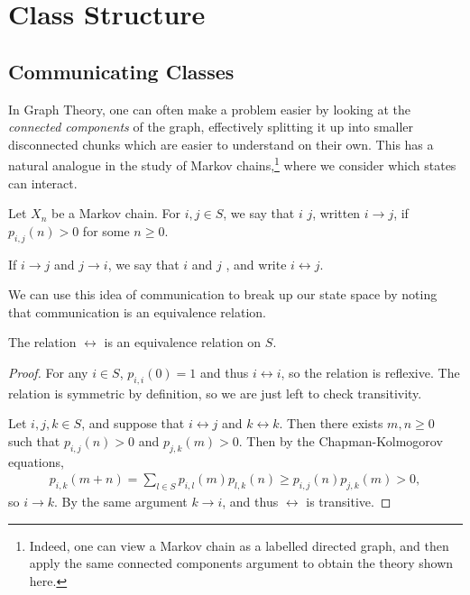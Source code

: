 \documentclass[a4paper]{scrartcl}
\begin{document}
\section{Class Structure}


\subsection{Communicating Classes}

In Graph Theory, one can often make a problem easier by looking at the \emph{connected components} of the graph, effectively splitting it up into smaller disconnected chunks which are easier to understand on their own. 
This has a natural analogue in the study of Markov chains,\footnote{Indeed, one can view a Markov chain as a labelled directed graph, and then apply the same connected components argument to obtain the theory shown here.} where we consider which states can interact.

\begin{definition}[Communication]
	Let $X_n$ be a Markov chain. For $i, j \in S$, we say that $i$  $j$, written $i \rightarrow j$, if $p_{i, j}(n) > 0$ for some $n \geq 0$.

	If $i \rightarrow j$ and $j \rightarrow i$, we say that $i$ and $j$ , and write $i \leftrightarrow j$.
\end{definition}

We can use this idea of communication to break up our state space by noting that communication is an equivalence relation.

\begin{theorem}
The relation $\leftrightarrow$ is an equivalence relation on $S$.
\end{theorem}
\begin{proof}
	For any $i \in S$, $p_{i, i}(0) = 1$ and thus $i \leftrightarrow i$, so the relation is reflexive. The relation is symmetric by definition, so we are just left to check transitivity.

	Let $i, j, k \in S$, and suppose that $i \leftrightarrow j$ and $k \leftrightarrow k$. Then there exists $m, n \geq 0$ such that $p_{i, j}(n) > 0$ and $p_{j, k}(m) > 0$. Then by the Chapman-Kolmogorov equations,
	\begin{align*}
		p_{i, k}(m + n) = \sum_{l \in S}p_{i, l}(m)p_{l, k}(n) \geq p_{i, j}(n) p_{j, k}(m) > 0,
	\end{align*}
	so $i \rightarrow k$. By the same argument $k \rightarrow i$, and thus $\leftrightarrow$ is transitive.
\end{proof}
\end{document}

